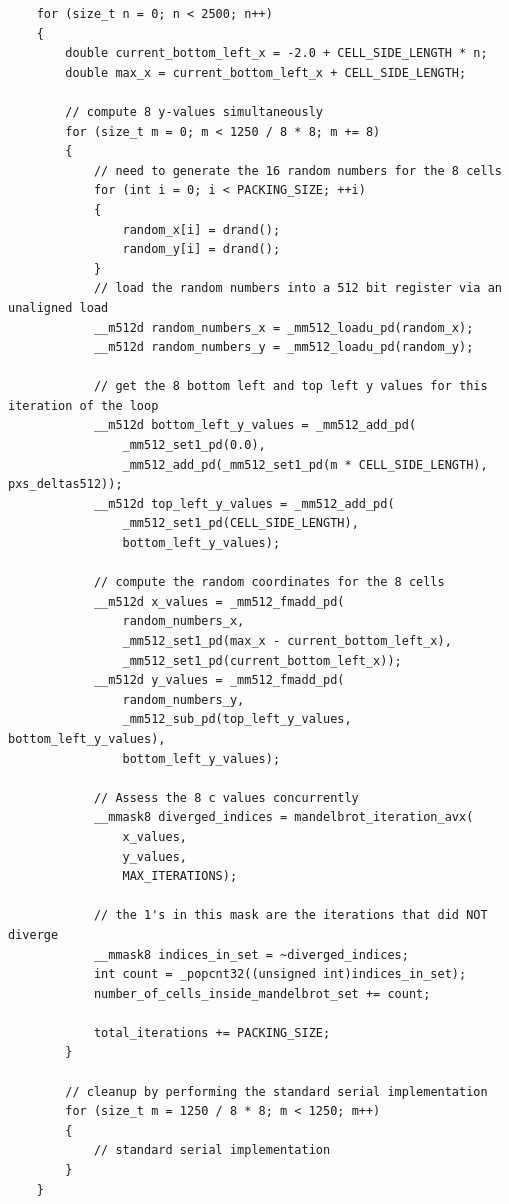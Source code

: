 \documentclass{article}
\begin{document}
\begin{lstlisting}
    for (size_t n = 0; n < 2500; n++)
    {
        double current_bottom_left_x = -2.0 + CELL_SIDE_LENGTH * n;
        double max_x = current_bottom_left_x + CELL_SIDE_LENGTH;

        // compute 8 y-values simultaneously
        for (size_t m = 0; m < 1250 / 8 * 8; m += 8)
        {
            // need to generate the 16 random numbers for the 8 cells
            for (int i = 0; i < PACKING_SIZE; ++i)
            {
                random_x[i] = drand();
                random_y[i] = drand();
            }
            // load the random numbers into a 512 bit register via an unaligned load
            __m512d random_numbers_x = _mm512_loadu_pd(random_x);
            __m512d random_numbers_y = _mm512_loadu_pd(random_y);

            // get the 8 bottom left and top left y values for this iteration of the loop
            __m512d bottom_left_y_values = _mm512_add_pd(
                _mm512_set1_pd(0.0),
                _mm512_add_pd(_mm512_set1_pd(m * CELL_SIDE_LENGTH), pxs_deltas512));
            __m512d top_left_y_values = _mm512_add_pd(
                _mm512_set1_pd(CELL_SIDE_LENGTH),
                bottom_left_y_values);

            // compute the random coordinates for the 8 cells
            __m512d x_values = _mm512_fmadd_pd(
                random_numbers_x,
                _mm512_set1_pd(max_x - current_bottom_left_x),
                _mm512_set1_pd(current_bottom_left_x));
            __m512d y_values = _mm512_fmadd_pd(
                random_numbers_y,
                _mm512_sub_pd(top_left_y_values, bottom_left_y_values),
                bottom_left_y_values);

            // Assess the 8 c values concurrently
            __mmask8 diverged_indices = mandelbrot_iteration_avx(
                x_values,
                y_values,
                MAX_ITERATIONS);

            // the 1's in this mask are the iterations that did NOT diverge
            __mmask8 indices_in_set = ~diverged_indices;
            int count = _popcnt32((unsigned int)indices_in_set);
            number_of_cells_inside_mandelbrot_set += count;

            total_iterations += PACKING_SIZE;
        }

        // cleanup by performing the standard serial implementation
        for (size_t m = 1250 / 8 * 8; m < 1250; m++)
        {
            // standard serial implementation
        }
    }
\end{lstlisting}
\end{document}
